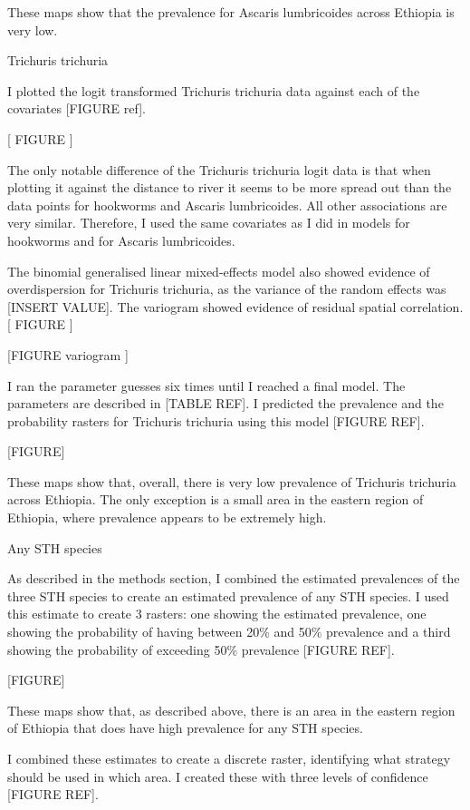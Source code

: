 \documentclass[
]{article}
\begin{document}
These maps show that the prevalence for Ascaris lumbricoides across
Ethiopia is very low.

Trichuris trichuria

I plotted the logit transformed Trichuris trichuria data against each of
the covariates {[}FIGURE ref{]}.

{[} FIGURE {]}

The only notable difference of the Trichuris trichuria logit data is
that when plotting it against the distance to river it seems to be more
spread out than the data points for hookworms and Ascaris lumbricoides.
All other associations are very similar. Therefore, I used the same
covariates as I did in models for hookworms and for Ascaris
lumbricoides.

The binomial generalised linear mixed-effects model also showed evidence
of overdispersion for Trichuris trichuria, as the variance of the random
effects was {[}INSERT VALUE{]}. The variogram showed evidence of
residual spatial correlation. {[} FIGURE {]}

{[}FIGURE variogram {]}

I ran the parameter guesses six times until I reached a final model. The
parameters are described in {[}TABLE REF{]}. I predicted the prevalence
and the probability rasters for Trichuris trichuria using this model
{[}FIGURE REF{]}.

{[}FIGURE{]}

These maps show that, overall, there is very low prevalence of Trichuris
trichuria across Ethiopia. The only exception is a small area in the
eastern region of Ethiopia, where prevalence appears to be extremely
high.

Any STH species

As described in the methods section, I combined the estimated
prevalences of the three STH species to create an estimated prevalence
of any STH species. I used this estimate to create 3 rasters: one
showing the estimated prevalence, one showing the probability of having
between 20\% and 50\% prevalence and a third showing the probability of
exceeding 50\% prevalence {[}FIGURE REF{]}.

{[}FIGURE{]}

These maps show that, as described above, there is an area in the
eastern region of Ethiopia that does have high prevalence for any STH
species.

I combined these estimates to create a discrete raster, identifying what
strategy should be used in which area. I created these with three levels
of confidence {[}FIGURE REF{]}.
\end{document}

